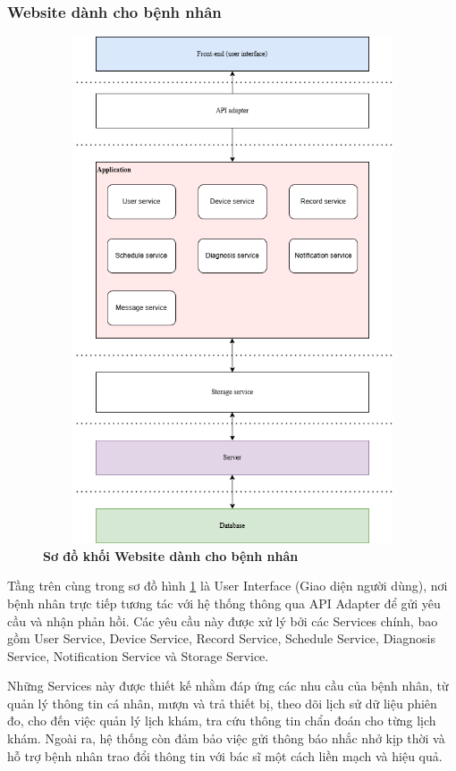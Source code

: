 \subsubsection{Website dành cho bệnh nhân}
\begin{figure}[H]
	\centering
	\includegraphics[width=12cm,height=15cm]{Images/System/fmECG_architecture-Patient.drawio.png}
	\caption[Sơ đồ khối Website dành cho bệnh nhân]{\bfseries \fontsize{12pt}{0pt}\selectfont Sơ đồ khối Website dành cho bệnh nhân}
	\label{fmECG_architecture-Patient} %
\end{figure}
Tầng trên cùng trong sơ đồ hình \ref{fmECG_architecture-Patient} là User Interface (Giao diện người dùng), nơi bệnh nhân trực tiếp tương tác với hệ thống thông qua API Adapter để gửi yêu cầu và nhận phản hồi.
Các yêu cầu này được xử lý bởi các Services chính, bao gồm User Service, Device Service, Record Service, Schedule Service, Diagnosis Service, Notification Service và Storage Service.

Những Services này được thiết kế nhằm đáp ứng các nhu cầu của bệnh nhân, từ quản lý thông tin cá nhân, mượn và trả thiết bị, theo dõi lịch sử dữ liệu phiên đo, cho đến việc quản lý lịch khám,
tra cứu thông tin chẩn đoán cho từng lịch khám. Ngoài ra, hệ thống còn đảm bảo việc gửi thông báo nhắc nhở kịp thời và hỗ trợ bệnh nhân trao đổi thông tin với bác sĩ một cách liền mạch và hiệu quả.

